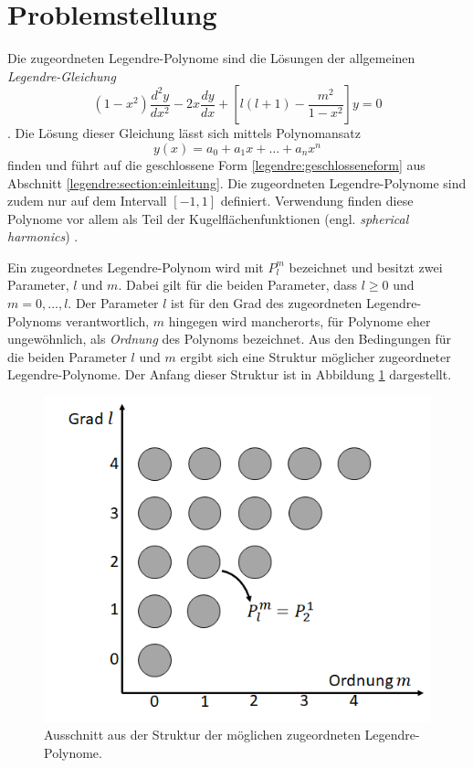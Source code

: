 %
%
%
\section{Problemstellung
\label{legendre:section:problemstellung}}
Die zugeordneten Legendre-Polynome sind die Lösungen der allgemeinen {\em Legendre-Gleichung}
%
\begin{equation}
(1-x^2) \frac{d^2y}{dx^2}
-2x \frac{dy}{dx}
+ \left[ l(l+1)- \frac{m^2}{1-x^2} \right] y
=0
\label{legendre:legendregleichung}
\end{equation}
\cite{legendre:assoc-legendre-poly-wolfram} \cite{legendre:assoc-legendre-diff-wolfram}.
Die Lösung dieser Gleichung lässt sich mittels Polynomansatz
\begin{equation}
y(x)=a_0+a_1x+ \ldots + a_nx^n
\label{legendre:polynomansatz}
\end{equation}
%
finden und führt auf die geschlossene Form \eqref{legendre:geschlosseneform} aus Abschnitt \ref{legendre:section:einleitung}.
Die zugeordneten Legendre-Polynome sind zudem nur auf dem Intervall $[-1, 1]$ definiert.
Verwendung finden diese Polynome vor allem als Teil der Kugelflächenfunktionen (engl. {\em spherical harmonics}) \cite{legendre:spherical-harmonic-wolfram}.
%

Ein zugeordnetes Legendre-Polynom wird mit $P^m_l$ bezeichnet und besitzt zwei Parameter, $l$ und $m$.
Dabei gilt für die beiden Parameter, dass $l\geq 0$ und $m=0, \ldots , l$.
Der Parameter $l$ ist für den Grad des zugeordneten Legendre-Polynoms verantwortlich, $m$ hingegen wird mancherorts, für Polynome eher ungewöhnlich, als {\em Ordnung} des Polynoms bezeichnet.
Aus den Bedingungen für die beiden Parameter $l$ und $m$ ergibt sich eine Struktur möglicher zugeordneter Legendre-Polynome.
Der Anfang dieser Struktur ist in Abbildung \ref{legendre:fig:struktur} dargestellt.
\begin{figure}[!ht]
\centering
\includegraphics[width=0.6\linewidth]{papers/legendre/plots/legendre_struktur}
\caption{Ausschnitt aus der Struktur der möglichen zugeordneten Legendre-Polynome.}
\label{legendre:fig:struktur}
\end{figure}

